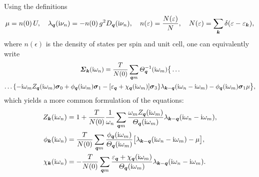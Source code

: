 Using the definitions \cite{MargineGiustino13}
%
\begin{align*}
    \mu = n(0) \, U,
        \quad
    \lambda_{\boldsymbol q}(\mathrm i \nu_n) = -n(0) \, g^2 D_{\boldsymbol q}(\mathrm i \nu_n),
        \quad
    n(\varepsilon) = \frac{N(\varepsilon)} N,
        \quad
    N(\varepsilon) = \sum_{\boldsymbol k} \delta(\varepsilon - \varepsilon_{\boldsymbol k}),
\end{align*}
%
where $n(\epsilon)$ is the density of states per spin and unit cell, one can
equivalently write
%
\begin{multline*}
    \boldsymbol {\varSigma}_{\boldsymbol k} (\mathrm i \omega_n)
    = \frac T {N(0)} \sum_{\boldsymbol q m}
    \varTheta_{\boldsymbol q}^{-1}(\mathrm i \omega_m) \big \{ \dots
        \\
        \dots \{
            - \mathrm i \omega_m Z_{\boldsymbol q}(\mathrm i \omega_m) \boldsymbol \sigma_0
            + \phi_{\boldsymbol q}(\mathrm i \omega_m) \boldsymbol \sigma_1
            - [\varepsilon_{\boldsymbol q} + \chi_{\boldsymbol q}(\mathrm i \omega_m)] \boldsymbol \sigma_3
            \}
        \lambda_{\boldsymbol k - \boldsymbol q}(\mathrm i \omega_n - \mathrm i \omega_m)
        - \phi_{\boldsymbol q}(\mathrm i \omega_m) \boldsymbol \sigma_1 \mu
    \big \},
\end{multline*}
%
which yields a more common formulation of the  equations:
%
\begin{subequations} \label{Eliashberg equations}
    \begin{align}
        Z_{\boldsymbol k}(\mathrm i \omega_n) &= 1 + \frac T {N(0)} \frac 1 {\omega_n}
        \sum_{\boldsymbol q m} \frac
            {\omega_m Z_{\boldsymbol q}(\mathrm i \omega_m)}
            {\varTheta_{\boldsymbol q}(\mathrm i \omega_m)}
        \lambda_{\boldsymbol k - \boldsymbol q}(\mathrm i \omega_n - \mathrm i \omega_m),
        \\
        \phi_{\boldsymbol k}(\mathrm i \omega_n) &= \frac T {N(0)}
        \sum_{\boldsymbol q m} \frac
            {\phi_{\boldsymbol q}(\mathrm i \omega_m)}
            {\varTheta_{\boldsymbol q}(\mathrm i \omega_m)}
        \big[ \lambda_{\boldsymbol k - \boldsymbol q}(\mathrm i \omega_n - \mathrm i \omega_m) - \mu \big],
        \\
        \chi_{\boldsymbol k}(\mathrm i \omega_n) &= -\frac T {N(0)}
        \sum_{\boldsymbol q m} \frac
            {\varepsilon_{\boldsymbol q} + \chi_{\boldsymbol q}(\mathrm i \omega_m)}
            {\varTheta_{\boldsymbol q}(\mathrm i \omega_m)}
        \lambda_{\boldsymbol k - \boldsymbol q}(\mathrm i \omega_n - \mathrm i \omega_m).
    \end{align}
\end{subequations}

